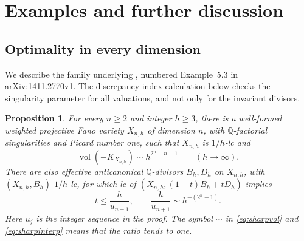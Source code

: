 \documentclass[11pt,reqno]{amsart}
\numberwithin{equation}{section}
\newtheorem{proposition}[theorem]{Proposition}
\theoremstyle{definition}
\theoremstyle{remark}
\newcommand{\Q}{\mathbb Q}
\newcommand{\vol}{\operatorname{vol}}
\begin{document}
\section{Examples and further discussion}\label{sec:examples}

\subsection{Optimality in every dimension}
We describe the family underlying \cite[Example~6.3]{Amb16}, numbered Example~5.3 in arXiv:1411.2770v1. The discrepancy-index calculation below checks the singularity parameter for all valuations, and not only for the invariant divisors.

\begin{proposition}\label{prop:examples}
For every $n\ge2$ and integer $h\ge3$, there is a well-formed weighted projective Fano variety $X_{n,h}$ of dimension $n$, with $\Q$-factorial singularities and Picard number one, such that $X_{n,h}$ is $1/h$-lc and
\begin{equation}\label{eq:sharpvol}
 \vol(-K_{X_{n,h}})\sim h^{2^n-n-1}\qquad(h\longrightarrow\infty).
\end{equation}
There are also effective anticanonical $\Q$-divisors $B_h,D_h$ on $X_{n,h}$, with $(X_{n,h},B_h)$ $1/h$-lc, for which lc of $(X_{n,h},(1-t)B_h+tD_h)$ implies
\begin{equation}\label{eq:sharpinterp}
 t\le\frac{h}{u_{n+1}},\qquad
 \frac{h}{u_{n+1}}\sim h^{-(2^n-1)}.
\end{equation}
Here $u_j$ is the integer sequence in the proof. The symbol $\sim$ in \eqref{eq:sharpvol} and \eqref{eq:sharpinterp} means that the ratio tends to one.
\end{proposition}
\end{document}
